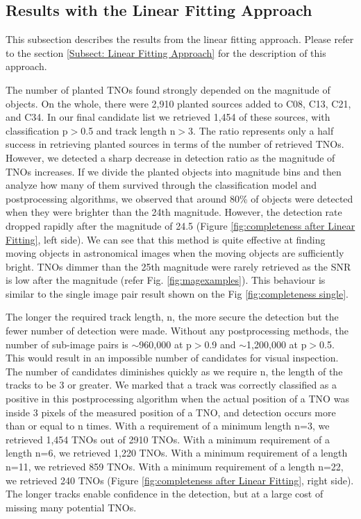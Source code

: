 \documentclass{aastex631}
\begin{document}
\subsection{Results with the Linear Fitting Approach}
\label{subsect:Retrieval rate on planted TNOs}

This subsection describes the results from the linear fitting approach.
Please refer to the section \ref{Subsect: Linear Fitting Approach} for the description of this approach.

The number of planted TNOs found strongly depended on the magnitude of objects.
On the whole, there were 2,910 planted sources added to C08, C13, C21, and C34.
In our final candidate list we retrieved 1,454 of these sources, with classification p$>$0.5 and track length n$>$3.
The ratio represents only a half success in retrieving planted sources in terms of the number of retrieved TNOs.
However, we detected a sharp decrease in detection ratio as the magnitude of TNOs increases.
If we divide the planted objects into magnitude bins and then analyze how many of them survived through the classification model and postprocessing algorithms, we observed that around 80\% of objects were detected when they were brighter than the 24th magnitude.
However, the detection rate dropped rapidly after the magnitude of 24.5 (Figure \ref{fig:completeness after Linear Fitting}, left side).
We can see that this method is quite effective at finding moving objects in astronomical images when the moving objects are sufficiently bright.
TNOs dimmer than the 25th magnitude were rarely retrieved as the SNR is low after the magnitude (refer Fig. \ref{fig:magexamples}). 
This behaviour is similar to the single image pair result shown on the Fig \ref{fig:completeness single}.

The longer the required track length, n, the more secure the detection but the fewer number of detection were made.
Without any postprocessing methods, the number of sub-image pairs is $\sim$960,000 at p$>$0.9 and $\sim$1,200,000 at p$>$0.5.
This would result in an impossible number of candidates for visual inspection.
The number of candidates diminishes quickly as we require n, the length of the tracks to be 3 or greater.
We marked that a track was correctly classified as a positive in this postprocessing algorithm when the actual position of a TNO was inside 3 pixels of the measured position of a TNO, and detection occurs more than or equal to n times.
With a requirement of a minimum length n=3, we retrieved 1,454 TNOs out of 2910 TNOs.
With a minimum requirement of a length n=6, we retrieved 1,220 TNOs.
With a minimum requirement of a length n=11, we retrieved 859 TNOs.
With a minimum requirement of a length n=22, we retrieved 240 TNOs (Figure \ref{fig:completeness after Linear Fitting}, right side).
The longer tracks enable confidence in the detection, but at a large cost of missing many potential TNOs.
\end{document}
